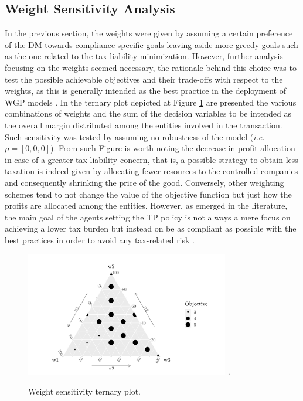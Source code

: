 \documentclass[conference,final,]{IEEEtran}
\begin{document}
\hypertarget{weight-sense}{%
\subsection{Weight Sensitivity Analysis}\label{results}}
In the previous section, the weights were given by assuming a certain preference of the DM towards compliance specific goals leaving aside more greedy goals such as the one related to the tax liability minimization. However, further analysis focusing on the weights seemed necessary, the rationale behind this choice was to test the possible achievable objectives and their trade-offs with respect to the weights, as this is generally intended as the best practice in the deployment of WGP models \cite{jones11}. In the ternary plot depicted at Figure \ref{tern} are presented the various combinations of weights and the sum of the decision variables to be intended as the overall margin distributed among the entities involved in the transaction. Such sensitivity was tested by assuming no robustness of the model (\emph{i.e.} $\rho = [0,0,0]$). From such Figure is worth noting the decrease in profit allocation in case of a greater tax liability concern, that is, a possible strategy to obtain less taxation is indeed given by allocating fewer resources to the controlled companies and consequently shrinking the price of the good. Conversely, other weighting schemes tend to not change the value of the objective function but just how the profits are allocated among the entities. However, as emerged in the literature, the main goal of the agents setting the TP policy is not always a mere focus on achieving a lower tax burden but instead on be as compliant as possible with the best practices in order to avoid any tax-related risk \cite{mescall18}\cite{klassen16}.
\begin{figure}
\centering
\includegraphics[width=3.5in]{figure/ternary.png}
\DeclareGraphicsExtensions.
\caption{Weight sensitivity ternary plot.}
\label{tern}
\end{figure}
\end{document}

